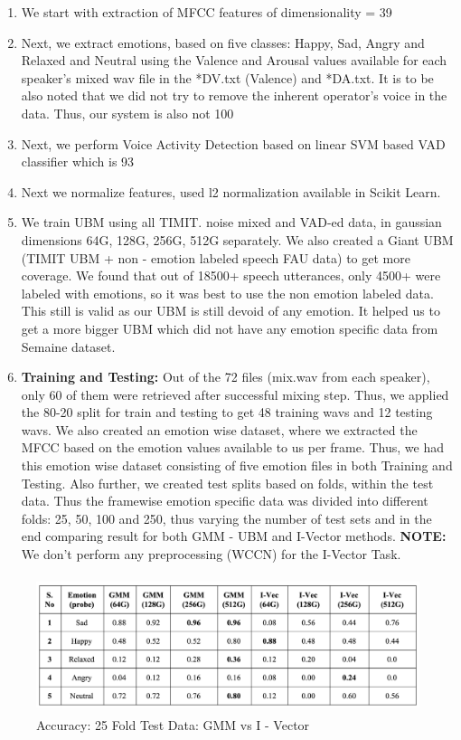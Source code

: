 \begin{enumerate}
\item We start with extraction of MFCC features of dimensionality  = 39 
\item Next, we extract emotions, based on five classes: Happy, Sad, Angry and Relaxed and Neutral using the Valence and Arousal values available for each speaker’s mixed wav file in the *DV.txt (Valence) and *DA.txt.  It is to be also noted that we did not try to remove the inherent operator’s voice in the data. Thus, our system is also not 100%
\item Next, we perform Voice Activity Detection based on linear SVM based VAD classifier which is 93%
\item Next we normalize features, used l2 normalization available in Scikit Learn.
\item We train UBM using all TIMIT\footnotemark {}. noise mixed and VAD-ed data, in gaussian dimensions 64G, 128G, 256G, 512G separately. We also created a Giant UBM (TIMIT UBM + non - emotion labeled speech FAU data) to get more  coverage. We found that out of 18500+ speech utterances, only 4500+ were labeled with emotions, so it was best to use the non emotion labeled data. This still is valid as our UBM is still devoid of any emotion. It helped us to get a more bigger UBM which did not have any emotion specific data from Semaine dataset.
\item \textbf{Training and Testing:} Out of the 72 files (mix.wav from each speaker), only 60 of them were retrieved after successful mixing step. Thus, we applied the 80-20 split for train and testing to get 48 training wavs and 12 testing wavs. We also created an emotion wise dataset, where we extracted the MFCC based on the emotion values available to us per frame. Thus, we had this emotion wise dataset consisting of five emotion files in both Training and Testing. Also further, we created test splits based on folds, within the test data. Thus the framewise emotion specific data was divided into different folds: 25, 50, 100 and 250, thus varying the number of test sets and in the end comparing result for both GMM - UBM and I-Vector methods. \textbf{NOTE:} We don’t perform any preprocessing (WCCN) for the I-Vector Task.
\end{enumerate}
\begin{figure}[ht!]
	\centering
		\includegraphics[height=40mm,  width=130mm]{figures/7_25fold.png}
		\caption[Emotion Recognition - Accuracy over 25 fold]{Accuracy: 25 Fold Test Data:  GMM vs I - Vector}
			\label{25fold}
\end{figure}
	
